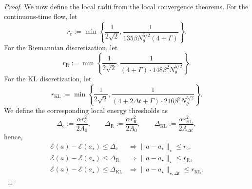 \documentclass[11pt]{article}
\theoremstyle{plain}
\theoremstyle{definition}
\theoremstyle{remark}
\begin{document}
\begin{proof}
    We now define the local radii from the local convergence theorems. For the continuous-time flow, let
    \[
        r_\mathrm{c}
        :=
        \min \left\{
            \frac{1}{2\sqrt{2}},
            \frac{1}{135\beta N_\theta^{5/2}(4+\Gamma)}
        \right\}.
    \]
    For the Riemannian discretization, let
    \[
        r_\mathrm{R}
        :=
        \min \left\{
            \frac{1}{2\sqrt{2}},
            \frac{1}{(4+\Gamma)\cdot 148\beta^2N_\theta^{5/2}}
        \right\}.
    \]
    For the KL discretization, let
    \[
        r_\mathrm{KL}
        :=
        \min \left\{
            \frac{1}{2\sqrt{2}},
            \frac{1}{(4+2\Delta t+\Gamma)\cdot 216\beta^2N_\theta^{5/2}}
        \right\}.
    \]
    We define the corresponding local energy thresholds as
    \[
        \Delta_\mathrm{c}
        :=
        \frac{\alpha r_\mathrm{c}^2}{2A_0},
        \qquad
        \Delta_\mathrm{R}
        :=
        \frac{\alpha r_\mathrm{R}^2}{2A_0},
        \qquad
        \Delta_\mathrm{KL}
        :=
        \frac{\alpha r_\mathrm{KL}^2}{2A_{\Delta t}},
    \]
    hence,
    \begin{align*}
        \mathcal E(a)-\mathcal E(a_\star)
        \leq
        \Delta_\mathrm{c}
        &\Longrightarrow
        \|a-a_\star\|_\star
        \leq
        r_\mathrm{c}, \\
        \mathcal E(a)-\mathcal E(a_\star)
        \leq
        \Delta_\mathrm{R}
        &\Longrightarrow
        \|a-a_\star\|_\star
        \leq
        r_\mathrm{R}, \\
        \mathcal E(a)-\mathcal E(a_\star)
        \leq
        \Delta_\mathrm{KL}
        &\Longrightarrow
        \|a-a_\star\|_{\star,\Delta t}
        \leq
        r_\mathrm{KL}.
    \end{align*}


\end{proof}
\end{document}
